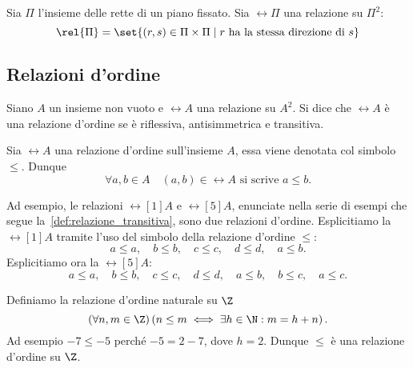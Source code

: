 \begin{example}
    Sia \(\Pi\) l'insieme delle rette di un piano fissato. Sia \(\rel{\Pi}\) una relazione su \(\Pi^2\):
    \[
        \rel{\Pi} = \set{(r, s) \in \Pi \times \Pi \mid r \text{ ha la stessa direzione di } s}
    \]
\end{example}


\subsection{Relazioni d'ordine}\label{subsec:relazioni_d'ordine}

\begin{definition}\label{def:relazione_d'ordine}
    Siano \(A\) un insieme non vuoto e \(\rel{A}\) una relazione su \(A^2\). Si dice che \(\rel{A}\) è una relazione d'ordine se è riflessiva, antisimmetrica e transitiva.
\end{definition}

\begin{remark}
    Sia \(\rel{A}\) una relazione d'ordine sull'insieme \(A\), essa viene denotata col simbolo \(\leq\). Dunque
    \[
        \forall a,b \in A \quad (a, b) \in \rel{A} \text{ si scrive } a \leq b.
    \]
\end{remark}

Ad esempio, le relazioni \(\rel[1]{A}\) e \(\rel[5]{A}\), enunciate nella serie di esempi che segue la~\cref{def:relazione_transitiva}, sono due relazioni d'ordine.
Esplicitiamo la \(\rel[1]{A}\) tramite l'uso del simbolo della relazione d'ordine \(\leq\):
\[
    a \leq a, \quad 
    b \leq b, \quad
    c \leq c, \quad
    d \leq d, \quad
    a \leq b.
\]
Esplicitiamo ora la \(\rel[5]{A}\):
\[
    a \leq a, \quad
    b \leq b, \quad
    c \leq c, \quad
    d \leq d, \quad
    a \leq b, \quad
    b \leq c, \quad
    a \leq c.
\]

\begin{example}
    Definiamo la relazione d'ordine naturale su  \(\Z\)
    \[
        (\forall n,m \in \Z) \left(n \leq m \iff \exists h \in \N : m = h + n \right).
    \]
    Ad esempio \(-7 \leq -5\) perché \(-5 = 2 - 7\), dove \(h = 2\).
    Dunque \(\leq\) è una relazione d'ordine su \(\Z\).
\end{example}

